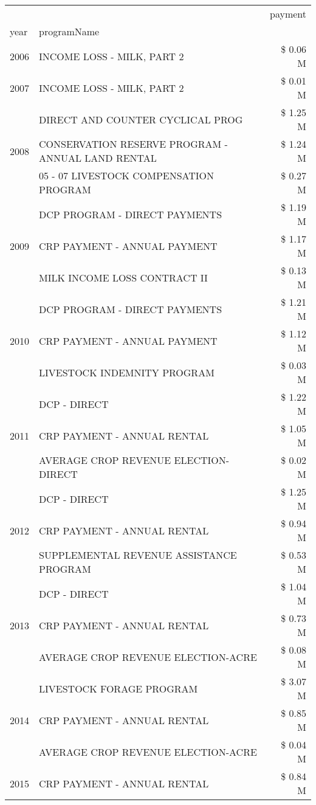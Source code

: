\begin{tabular}{llr}
\toprule
 &  & payment \\
year & programName &  \\
\midrule
2006 & INCOME LOSS - MILK, PART 2 & \$ 0.06 M \\
\cline{1-3}
2007 & INCOME LOSS - MILK, PART 2 & \$ 0.01 M \\
\cline{1-3}
\multirow[t]{3}{*}{2008} & DIRECT AND COUNTER CYCLICAL PROG & \$ 1.25 M \\
 & CONSERVATION RESERVE PROGRAM - ANNUAL LAND RENTAL & \$ 1.24 M \\
 & 05 - 07 LIVESTOCK COMPENSATION PROGRAM & \$ 0.27 M \\
\cline{1-3}
\multirow[t]{3}{*}{2009} & DCP PROGRAM - DIRECT PAYMENTS & \$ 1.19 M \\
 & CRP PAYMENT - ANNUAL PAYMENT & \$ 1.17 M \\
 & MILK INCOME LOSS CONTRACT II & \$ 0.13 M \\
\cline{1-3}
\multirow[t]{3}{*}{2010} & DCP PROGRAM - DIRECT PAYMENTS & \$ 1.21 M \\
 & CRP PAYMENT - ANNUAL PAYMENT & \$ 1.12 M \\
 & LIVESTOCK INDEMNITY PROGRAM & \$ 0.03 M \\
\cline{1-3}
\multirow[t]{3}{*}{2011} & DCP - DIRECT & \$ 1.22 M \\
 & CRP PAYMENT - ANNUAL RENTAL & \$ 1.05 M \\
 & AVERAGE CROP REVENUE ELECTION-DIRECT & \$ 0.02 M \\
\cline{1-3}
\multirow[t]{3}{*}{2012} & DCP - DIRECT & \$ 1.25 M \\
 & CRP PAYMENT - ANNUAL RENTAL & \$ 0.94 M \\
 & SUPPLEMENTAL REVENUE ASSISTANCE PROGRAM & \$ 0.53 M \\
\cline{1-3}
\multirow[t]{3}{*}{2013} & DCP - DIRECT & \$ 1.04 M \\
 & CRP PAYMENT - ANNUAL RENTAL & \$ 0.73 M \\
 & AVERAGE CROP REVENUE ELECTION-ACRE & \$ 0.08 M \\
\cline{1-3}
\multirow[t]{3}{*}{2014} & LIVESTOCK FORAGE PROGRAM & \$ 3.07 M \\
 & CRP PAYMENT - ANNUAL RENTAL & \$ 0.85 M \\
 & AVERAGE CROP REVENUE ELECTION-ACRE & \$ 0.04 M \\
\cline{1-3}
\multirow[t]{3}{*}{2015} & CRP PAYMENT - ANNUAL RENTAL & \$ 0.84 M \\

\end{tabular}
